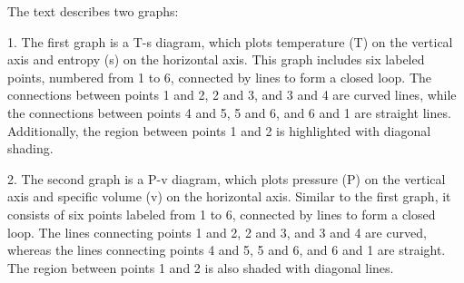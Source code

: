 The text describes two graphs:

1. The first graph is a T-s diagram, which plots temperature (T) on the vertical axis and entropy (s) on the horizontal axis. This graph includes six labeled points, numbered from 1 to 6, connected by lines to form a closed loop. The connections between points 1 and 2, 2 and 3, and 3 and 4 are curved lines, while the connections between points 4 and 5, 5 and 6, and 6 and 1 are straight lines. Additionally, the region between points 1 and 2 is highlighted with diagonal shading.

2. The second graph is a P-v diagram, which plots pressure (P) on the vertical axis and specific volume (v) on the horizontal axis. Similar to the first graph, it consists of six points labeled from 1 to 6, connected by lines to form a closed loop. The lines connecting points 1 and 2, 2 and 3, and 3 and 4 are curved, whereas the lines connecting points 4 and 5, 5 and 6, and 6 and 1 are straight. The region between points 1 and 2 is also shaded with diagonal lines.